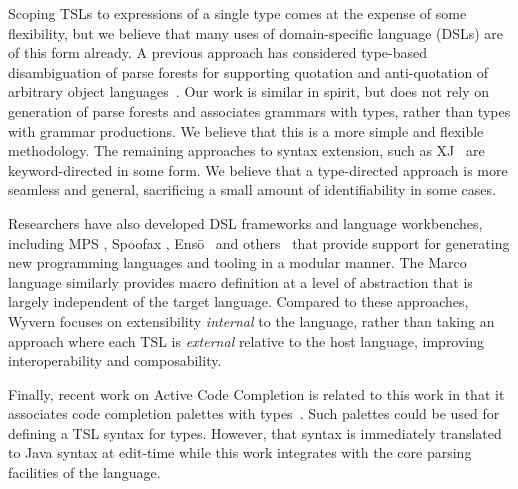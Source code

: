 Scoping TSLs to expressions of a single type comes at the expense of some flexibility, but we believe that many uses of domain-specific language (DSLs) are of this form already. A previous approach has considered type-based disambiguation of parse forests for supporting quotation and anti-quotation of arbitrary object languages~\cite{bravenboer2005generalized}. Our work is similar in spirit, but does not rely on generation of parse forests and associates grammars with types, rather than types with grammar productions. We believe that this is a more simple and flexible methodology. The remaining approaches to syntax extension, such as XJ~\cite{DBLP:conf/scam/ClarkSW08} are keyword-directed in some form. We believe that a type-directed approach is more seamless and general, sacrificing a small amount of identifiability in some cases.

Researchers have also developed DSL frameworks and language workbenches, including MPS \cite{mps}, Spoofax \cite{KatsVisser2010}, Ens\={o}~\cite{enso} and others~\cite{krahn2008monticore,van1992pregmatic} that provide support for generating new programming languages and tooling in a modular manner.  
The Marco language \cite{lee:2012:marco} similarly provides macro definition at a level of abstraction that is largely independent of the target language.
Compared to these approaches, Wyvern focuses on extensibility \emph{internal} to the language, rather than taking an approach where each TSL is \emph{external} relative to the host language, improving interoperability and composability.

Finally, recent work on Active Code Completion is related to this work in that it associates code completion palettes with types~\cite{omar2012active}. Such palettes could be used for defining a TSL syntax for types. However, that syntax is immediately translated to Java syntax at edit-time while this work integrates with the core parsing facilities of the language.


